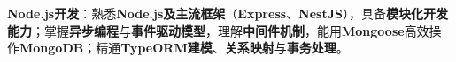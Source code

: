 \item \textbf{Node.js开发}：熟悉\textbf{Node.js及主流框架}（\textbf{Express}、\textbf{NestJS}），具备\textbf{模块化开发能力}；掌握\textbf{异步编程}与\textbf{事件驱动模型}，理解\textbf{中间件机制}，能用\textbf{Mongoose}高效操作\textbf{MongoDB}；精通\textbf{TypeORM建模}、\textbf{关系映射}与\textbf{事务处理}。